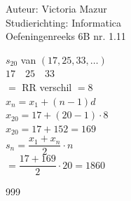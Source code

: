 \documentclass[a4paper]{article}
\begin{document}
  
\noindent \large Auteur: Victoria Mazur \\
\noindent \large Studierichting: Informatica\\
\noindent \large Oefeningenreeks 6B nr. 1.11\\

\medskip

\normalsize

$s_{20}$ van $(17, 25, 33, \dots)$\\

$17 \quad 25 \quad 33$\\

$=$ RR verschil $=8$\\

$x_{n} = x_{1} + (n-1)d$\\

$x_{20} = 17 + (20-1) \cdot 8$\\

$x_{20} = 17 + 152 = 169$\\

$s_{n} = \dfrac{x_{1} + x_{n}}{2} \cdot n$\\

$= \dfrac{17 + 169}{2} \cdot 20 = 1860$

\begin{thebibliography}{999}
\end{thebibliography}
\end{document}
